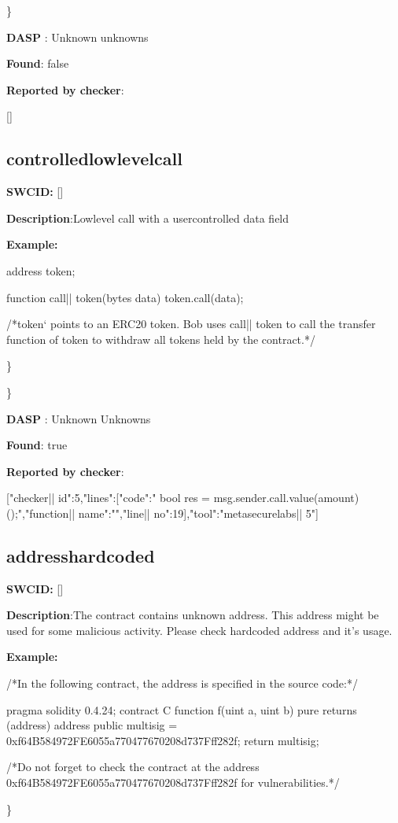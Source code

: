 \documentclass{article}
\begin{document}
\} 

\textbf{DASP} : Unknown unknowns

\textbf{Found}: false

\textbf{Reported by checker}: 
\begin{ffcode} 

[]
\end{ffcode} 
\subsection{controlled{\textunderscore}lowlevel{\textunderscore}call} 
\textbf{SWC{\textunderscore}ID:} []

\textbf{Description}:Low{\textendash}level call with a user{\textendash}controlled data field


\textbf{Example:} 
\begin{ffcode} 

address token;

function call|\textunderscore| token(bytes data){
  token.call(data);
}

 /*token` points to an ERC20 token. Bob uses call|\textunderscore| token to call the transfer function of token to withdraw all tokens held by the contract.*/ 

\end{ffcode} 
\} 

\} 

\textbf{DASP} : Unknown Unknowns

\textbf{Found}: true

\textbf{Reported by checker}: 
\begin{ffcode} 

[{"checker|\textunderscore| id":5,"lines":[{"code":"      bool res = msg.sender.call.value(amount)();\n","function|\textunderscore| name":"","line|\textunderscore| no":19}],"tool":"metasecurelabs|\textendash| 5"}]
\end{ffcode} 
\subsection{address{\textunderscore}hardcoded} 
\textbf{SWC{\textunderscore}ID:} []

\textbf{Description}:The contract contains unknown address. This address might be used for some malicious activity. Please check hardcoded address and it's usage.


\textbf{Example:} 
\begin{ffcode} 

/*In the following contract, the address is specified in the source code:*/ 

pragma solidity 0.4.24;
contract C {
  function f(uint a, uint b) pure returns (address) {
    address public multisig = 0xf64B584972FE6055a770477670208d737Fff282f;
    return multisig;
        }
}

 /*Do not forget to check the contract at the address 0xf64B584972FE6055a770477670208d737Fff282f for vulnerabilities.*/ 

\end{ffcode} 
\} 
\end{document}
